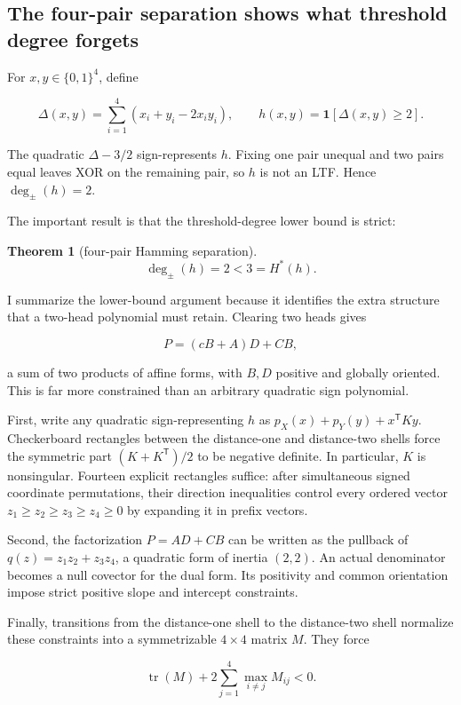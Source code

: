 \documentclass[10pt]{article}
\newtheorem{theorem}{Theorem}
\theoremstyle{definition}
\theoremstyle{remark}
\newcommand{\cube}{\{0,1\}}
\newcommand{\Hstar}{H^{\ast}}
\newcommand{\tdeg}{\deg_{\pm}}
\begin{document}
\subsection{The four-pair separation shows what threshold degree forgets}

For $x,y\in\cube^4$, define

\[
\Delta(x,y)=\sum_{i=1}^{4}(x_i+y_i-2x_i y_i),\qquad
h(x,y)=\mathbf 1[\Delta(x,y)\geq2].
\]

The quadratic $\Delta-3/2$ sign-represents $h$. Fixing one pair unequal and two
pairs equal leaves XOR on the remaining pair, so $h$ is not an LTF. Hence
$\tdeg(h)=2$.

The important result is that the threshold-degree lower bound is strict:

\begin{theorem}[four-pair Hamming separation]
\[
\tdeg(h)=2<3=\Hstar(h).
\]
\end{theorem}

I summarize the lower-bound argument because it identifies the extra structure that a
two-head polynomial must retain. Clearing two heads gives

\[
P=(cB+A)D+CB,
\]

a sum of two products of affine forms, with $B,D$ positive and globally oriented. This is
far more constrained than an arbitrary quadratic sign polynomial.

First, write any quadratic sign-representing $h$ as
$p_X(x)+p_Y(y)+x^{\mathsf T}Ky$. Checkerboard rectangles between the distance-one
and distance-two shells force the symmetric part $(K+K^{\mathsf T})/2$ to be negative
definite. In particular, $K$ is nonsingular. Fourteen explicit rectangles suffice: after
simultaneous signed coordinate permutations, their direction inequalities control every
ordered vector $z_1\geq z_2\geq z_3\geq z_4\geq0$ by expanding it in prefix vectors.

Second, the factorization $P=AD+CB$ can be written as the pullback of
$q(z)=z_1z_2+z_3z_4$, a quadratic form of inertia $(2,2)$. An actual denominator
becomes a null covector for the dual form. Its positivity and common orientation impose
strict positive slope and intercept constraints.

Finally, transitions from the distance-one shell to the distance-two shell normalize
these constraints into a symmetrizable $4\times4$ matrix $M$. They force

\[
\operatorname{tr}(M)+2\sum_{j=1}^{4}\max_{i\neq j}M_{ij}<0.
\]
\end{document}
